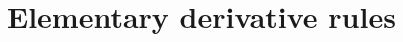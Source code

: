 \section{Elementary derivative rules} \label{S:2.1.ElemRules}



\newpage



\newpage



\newpage



\newpage
